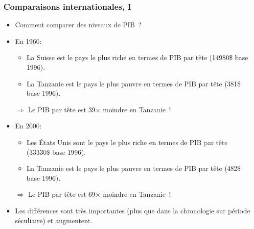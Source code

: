 \documentclass[10pt]{beamer}
\begin{document}
\begin{frame}
  \frametitle{Comparaisons internationales, I}

\bigskip

  \begin{itemize}

  \item Comment comparer des niveaux de PIB ?\newline

  \item En 1960:

    \begin{itemize}
    \item La Suisse est le pays le plus riche en termes de PIB par tête (14980\$ base 1996).
    \item La Tanzanie est le pays le plus pauvre en termes de PIB par tête (381\$ base 1996).
    \end{itemize}

    $\Rightarrow$ Le PIB par tête est 39$\times$ moindre en Tanzanie !\newline

  \item En 2000:

    \begin{itemize}
    \item Les États Unis sont le pays le plus riche en termes de PIB par tête (33330\$ base 1996).
    \item La Tanzanie est le pays le plus pauvre en termes de PIB par tête (482\$ base 1996).
    \end{itemize}

    $\Rightarrow$ Le PIB par tête est 69$\times$ moindre en Tanzanie !\newline

  \item Les différences sont très importantes (plus que dans la chronologie sur période séculiaire) et augmentent.\newline

  \end{itemize}

\end{frame}
\end{document}
